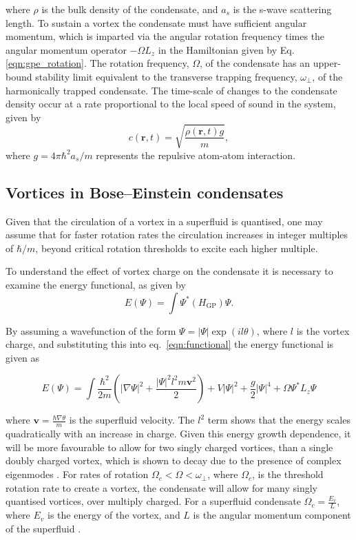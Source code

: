 where $\rho$ is the bulk density of the condensate, and $a_s$ is the s-wave scattering length. To sustain a vortex the condensate must have sufficient angular momentum, which is imparted via the angular rotation frequency times the angular momentum operator $-\Omega L_z$ in the Hamiltonian given by Eq. \eqref{eqn:gpe_rotation}. The rotation frequency, $\Omega$, of the condensate has an upper-bound stability limit equivalent to the transverse trapping frequency, $\omega_{\perp}$, of the harmonically trapped condensate. The time-scale of changes to the condensate density occur at a rate proportional to the local speed of sound in the system, given by
\begin{equation}
c(\textbf{r},t) = \sqrt{\frac{\rho (\textbf{r},t) g}{m}},
\end{equation}
where $g=4\pi\hbar^2 a_s/m$ represents the repulsive atom-atom interaction.

\subsection{Vortices in Bose--Einstein condensates}\label{ss:vorticesinbec}

Given that the circulation of a vortex in a superfluid is quantised, one may assume that for faster rotation rates the circulation increases in integer multiples of $\hbar/m$, beyond critical rotation thresholds to excite each higher multiple. %

To understand the effect of vortex charge on the condensate it is necessary to examine the energy functional, as given by
    \begin{equation}\label{eqn:functional}
        E(\Psi) = \int \Psi^{*} (H_{\text{GP}}) \Psi.
    \end{equation}

By assuming a wavefunction of the form $\Psi = |\Psi|\exp(il\theta)$, where $l$ is the vortex charge, and substituting this into eq.~\eqref{eqn:functional} the energy functional is given as

\begin{equation}\label{eqn:functional_full}
    E(\Psi) = \int \frac{\hbar^2}{2m} \left(|\nabla\Psi|^2  + \frac{|\Psi|^2 l^2 m \mathbf{v}^2}{2}  \right) + V|\Psi|^2 + \frac{g}{2}|\Psi|^4 + \Omega \Psi^{*} L_z \Psi
\end{equation}

where $\mathbf{v} = \frac{\hbar\nabla \theta}{m}$ is the superfluid velocity. The $l^2$ term shows that the energy scales quadratically with an increase in charge.  Given this energy growth dependence, it will be more favourable to allow for two singly charged vortices, than a single doubly charged vortex, which is shown to decay due to the presence of complex eigenmodes \cite{VTX:Kawaguchi_pra_2004}. For rates of rotation $\Omega_c < \Omega < \omega_\perp$, where $\Omega_c$, is the threshold rotation rate to create a vortex, the condensate will allow for many singly quantised vortices, over multiply charged. For a superfluid condensate $\Omega_c = \frac{E_v}{L}$, where $E_v$ is the energy of the vortex, and $L$ is the angular momentum component of the superfluid \cite{BK:Pitaevskii_Stringari_2003}.

